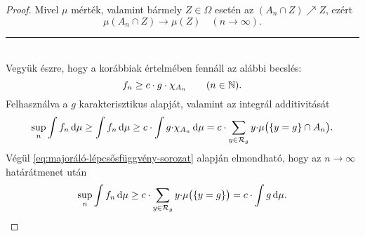 \documentclass[
]{elteikthesis}[2024/04/26]
\begin{document}
\begin{proof}
		Mivel \( \mu \) mérték, valamint bármely \( Z \in \Omega \) esetén 
		az \( (A_n \cap Z) \nearrow Z \), ezért
		\begin{equation}\label{eq:majoráló-lépcsősfüggvény-sorozat}
			\mu(A_n \cap Z) \longrightarrow \mu(Z) \quad (n \to \infty). \tag{\( * \)}
		\end{equation}
		
		\noindent\rule{\linewidth}{0.4pt}\\
		
		Vegyük észre, hogy a korábbiak értelmében fennáll az alábbi becslés:
		\[
			f_n \geq c \cdot g \cdot \chi_{A_n} \qquad (n \in \mathbb{N}).
		\]
		Felhasználva a \( g \) karakterisztikus alapját, 
		valamint az integrál additivitását
		\[
			\sup_{n} \int f_n \mathop{}\!\mathrm{d}{\mu} \geq
			\int f_n \mathop{}\!\mathrm{d}{\mu} \geq 
			c \cdot \int g {\cdot} \chi_{A_n} \mathop{}\!\mathrm{d}{\mu} = 
			c \cdot \sum_{y \in \mathcal{R}_{g}} y {\cdot} \mu\bigl( \{ y = g \} \cap A_n \bigr).
		\]
		Végül \eqref{eq:majoráló-lépcsősfüggvény-sorozat} alapján elmondható, 
		hogy az \( n \to \infty \) határátmenet után
		\[
			\sup_{n} \int f_n \mathop{}\!\mathrm{d}{\mu} \geq 
			c \cdot \sum_{y \in \mathcal{R}_{g}} y {\cdot} \mu\bigl( \{ y = g \} \bigr) =
			c \cdot \int g \mathop{}\!\mathrm{d}{\mu}.
		\]
	\end{proof}
\end{document}
